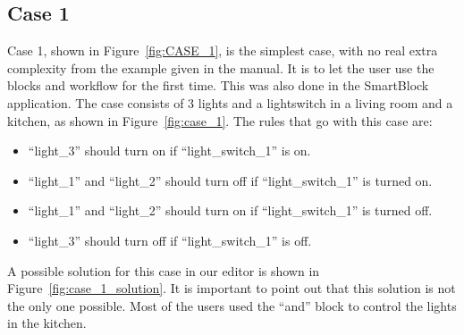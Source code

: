 \documentclass[11pt,a4paper]{report}
\begin{document}
\subsection{Case 1}
Case 1, shown in Figure~\ref{fig:CASE_1}, is the simplest case, with no real extra complexity from the example given in the manual. It is to let the user use the blocks and workflow for the first time. This was also done in the SmartBlock~\cite{SOTA_SmartBlock} application. The case consists of 3 lights and a lightswitch in a living room and a kitchen, as shown in Figure~\ref{fig:case_1}. The rules that go with this case are:
\begin{itemize}
    \item ``light\_3'' should turn on if ``light\_switch\_1'' is on.
    \item ``light\_1'' and ``light\_2'' should turn off if ``light\_switch\_1'' is turned on.
    \item ``light\_1'' and ``light\_2'' should turn on if ``light\_switch\_1'' is turned off.
    \item ``light\_3'' should turn off if ``light\_switch\_1'' is off.
\end{itemize}
A possible solution for this case in our editor is shown in Figure~\ref{fig:case_1_solution}. It is important to point out that this solution is not the only one possible. Most of the users used the ``and'' block to control the lights in the kitchen.
\end{document}
